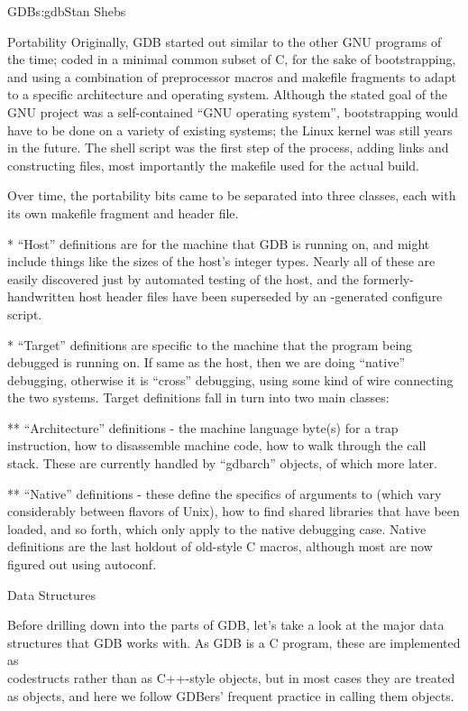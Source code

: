 \begin{aosachapter}{GDB}{s:gdb}{Stan Shebs}
\begin{aosasect1}{Portability}
Originally, GDB started out similar to the other GNU programs of the
time; coded in a minimal common subset of C, for the sake of
bootstrapping, and using a combination of preprocessor macros and
makefile fragments to adapt to a specific architecture and operating
system.  Although the stated goal of the GNU project was a
self-contained ``GNU operating system'', bootstrapping would have to
be done on a variety of existing systems; the Linux kernel was still
years in the future.  The  shell script was the first
step of the process, adding links and constructing files, most
importantly the makefile used for the actual build.

Over time, the portability bits came to be separated into three
classes, each with its own makefile fragment and header file.

* ``Host'' definitions are for the machine that GDB is running on, and
might include things like the sizes of the host's integer types.
Nearly all of these are easily discovered just by automated testing of
the host, and the formerly-handwritten host header files have been
superseded by an -generated configure script.

* ``Target'' definitions are specific to the machine that the program
being debugged is running on.  If same as the host, then we are doing
``native'' debugging, otherwise it is ``cross'' debugging, using some
kind of wire connecting the two systems.  Target definitions fall in
turn into two main classes:

** ``Architecture'' definitions - the machine language byte(s) for a
trap instruction, how to disassemble machine code, how to walk
through the call stack.  These are currently handled by ``gdbarch''
objects, of which more later.

** ``Native'' definitions - these define the specifics of arguments to
 (which vary considerably between flavors of Unix), how to
find shared libraries that have been loaded, and so forth, which only
apply to the native debugging case.  Native definitions are the last
holdout of old-style C macros, although most are now figured out using
autoconf.

\end{aosasect1}

\begin{aosasect1}{Data Structures}

Before drilling down into the parts of GDB, let's take a look at the
major data structures that GDB works with.  As GDB is a C program,
these are implemented as \\code{struct}s rather than as C++-style objects, but
in most cases they are treated as objects, and here we follow GDBers'
frequent practice in calling them objects.


\end{aosasect1}
\end{aosachapter}
